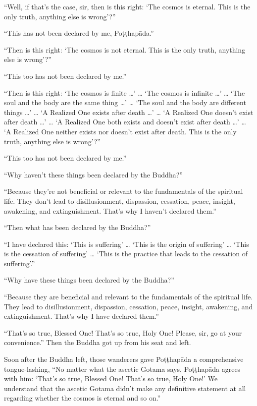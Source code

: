 \documentclass[12pt,openany]{book}%
\begin{document}
“Well, if that’s the case, sir, then is this right: ‘The cosmos is eternal. This is the only truth, anything else is wrong’?” 

“This has not been declared by me, \textsanskrit{Poṭṭhapāda}.” 

“Then is this right: ‘The cosmos is not eternal. This is the only truth, anything else is wrong’?” 

“This too has not been declared by me.” 

“Then is this right: ‘The cosmos is finite …’ … ‘The cosmos is infinite …’ … ‘The soul and the body are the same thing …’ … ‘The soul and the body are different things …’ … ‘A Realized One exists after death …’ … ‘A Realized One doesn’t exist after death …’ … ‘A Realized One both exists and doesn’t exist after death …’ … ‘A Realized One neither exists nor doesn’t exist after death. This is the only truth, anything else is wrong’?” 

“This too has not been declared by me.” 

“Why haven’t these things been declared by the Buddha?” 

“Because they’re not beneficial or relevant to the fundamentals of the spiritual life. They don’t lead to disillusionment, dispassion, cessation, peace, insight, awakening, and extinguishment. That’s why I haven’t declared them.” 

“Then what has been declared by the Buddha?” 

“I have declared this: ‘This is suffering’ … ‘This is the origin of suffering’ … ‘This is the cessation of suffering’ … ‘This is the practice that leads to the cessation of suffering’.” 

“Why have these things been declared by the Buddha?” 

“Because they are beneficial and relevant to the fundamentals of the spiritual life. They lead to disillusionment, dispassion, cessation, peace, insight, awakening, and extinguishment. That’s why I have declared them.” 

“That’s so true, Blessed One! That’s so true, Holy One! Please, sir, go at your convenience.” Then the Buddha got up from his seat and left. 

Soon after the Buddha left, those wanderers gave \textsanskrit{Poṭṭhapāda} a comprehensive tongue-lashing, “No matter what the ascetic Gotama says, \textsanskrit{Poṭṭhapāda} agrees with him: ‘That’s so true, Blessed One! That’s so true, Holy One!’ We understand that the ascetic Gotama didn’t make any definitive statement at all regarding whether the cosmos is eternal and so on.” 
\end{document}
